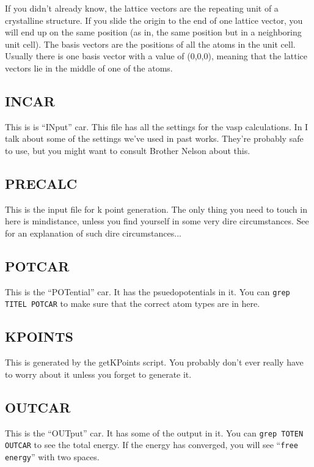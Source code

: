 \documentclass{article}
\begin{document}
If you didn't already know, the lattice vectors are the repeating unit
of a crystalline structure. If you slide the origin to the end of one
lattice vector, you will end up on the same position (as in, the same position
but in a neighboring unit cell). The basis vectors are the positions
of all the atoms in the unit cell. Usually there is one basis vector
with a value of (0,0,0), meaning that the lattice vectors lie in the
middle of one of the atoms. 

\subsection*{INCAR}
This is is ``INput'' car. This file has all the settings for the vasp calculations. In
 I talk about some of the settings we've
used in past works. They're probably safe to use, but you might want
to consult Brother Nelson about this. 

\subsection*{PRECALC}
This is the input file for k point generation. The only thing you need
to touch in here is mindistance, unless you find yourself in some very
dire circumstances. See  for an explanation
of such dire circumstances...

\subsection*{POTCAR}
This is the ``POTential'' car. It has the psuedopotentials in it. You
can \verb|grep TITEL POTCAR| to make sure that the correct atom types
are in here.   

\subsection*{KPOINTS}
This is generated by the getKPoints script. You probably don't ever
really have to worry about it unless you forget to generate it. 

\subsection*{OUTCAR} 
This is the ``OUTput'' car. It has some of the output in it. You can
\verb|grep TOTEN OUTCAR|  to see the total energy. If the energy has
converged, you will see ``\verb|free  energy|'' with two spaces.
\end{document}
